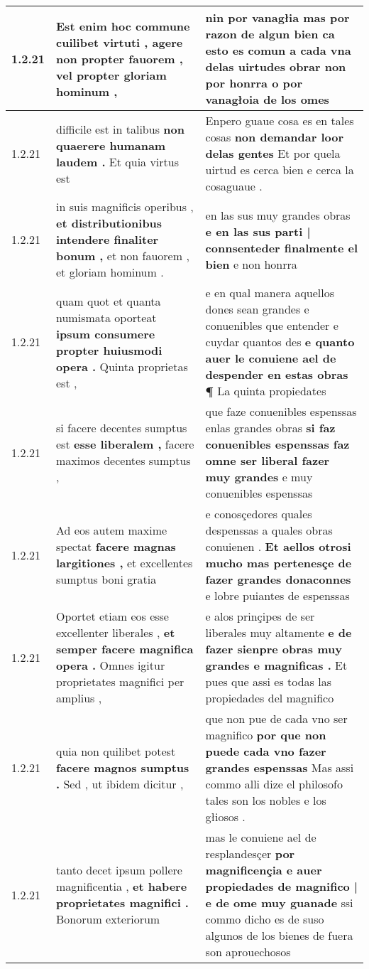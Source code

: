 \begin{tabular}{|p{1cm}|p{6.5cm}|p{6.5cm}|}
1.2.21 & Est enim hoc commune cuilibet virtuti , \textbf{ agere non propter fauorem , } vel propter gloriam hominum , & nin por vanagłia mas por razon de algun bien \textbf{ ca esto es comun a cada vna delas uirtudes obrar non } por honrra o por vanagłoia de los omes \\\hline
1.2.21 & difficile est in talibus \textbf{ non quaerere humanam laudem . } Et quia virtus est & Enpero guaue cosa es en tales cosas \textbf{ non demandar loor delas gentes } Et por quela uirtud es cerca bien e cerca la cosaguaue . \\\hline
1.2.21 & in suis magnificis operibus , \textbf{ et distributionibus intendere finaliter bonum , } et non fauorem , et gloriam hominum . & en las sus muy grandes obras \textbf{ e en las sus parti | connsenteder finalmente el bien } e non honrra \\\hline
1.2.21 & quam quot et quanta numismata oporteat \textbf{ ipsum consumere propter huiusmodi opera . } Quinta proprietas est , & e en qual manera aquellos dones sean grandes e conuenibles que entender e cuydar quantos des \textbf{ e quanto auer le conuiene ael de despender en estas obras ¶ } La quinta propiedates \\\hline
1.2.21 & si facere decentes sumptus est \textbf{ esse liberalem , } facere maximos decentes sumptus , & que faze conuenibles espenssas enlas grandes obras \textbf{ si faz conuenibles espenssas faz omne ser liberal fazer muy grandes } e muy conuenibles espenssas \\\hline
1.2.21 & Ad eos autem maxime spectat \textbf{ facere magnas largitiones , } et excellentes sumptus boni gratia & e conosçedores quales despenssas a quales obras conuienen . \textbf{ Et aellos otrosi mucho mas pertenesçe de fazer grandes donaconnes } e lobre puiantes de espenssas \\\hline
1.2.21 & Oportet etiam eos esse excellenter liberales , \textbf{ et semper facere magnifica opera . } Omnes igitur proprietates magnifici per amplius , & e alos prinçipes de ser liberales muy altamente \textbf{ e de fazer sienpre obras muy grandes e magnificas . } Et pues que assi es todas las propiedades del magnifico \\\hline
1.2.21 & quia non quilibet potest \textbf{ facere magnos sumptus . } Sed , ut ibidem dicitur , & que non pue de cada vno ser magnifico \textbf{ por que non puede cada vno fazer grandes espenssas } Mas assi commo alli dize el philosofo tales son los nobles e los głiosos . \\\hline
1.2.21 & tanto decet ipsum pollere magnificentia , \textbf{ et habere proprietates magnifici . } Bonorum exteriorum & mas le conuiene ael de resplandesçer \textbf{ por magnificençia e auer propiedades de magnifico | e de ome muy guanade } ssi commo dicho es de suso algunos de los bienes de fuera son aprouechosos \\\hline

\end{tabular}
